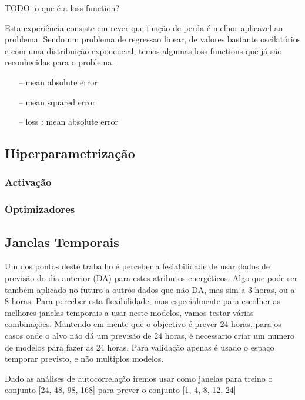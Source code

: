 TODO: o que é a loss function?

Esta experiência consiste em rever que função de perda é melhor aplicavel ao problema. Sendo um problema de regressao linear, de valores bastante oscilatórios e com uma distribuição exponencial, temos algumas loss functions que já são reconhecidas para o problema.

\begin{itemize}
    \item[--] mean absolute error
    \item[--] mean squared error    
    \item[--] loss : mean absolute error

\end{itemize}



\subsection{Hiperparametrização}

\subsubsection{Activação}

\subsubsection{Optimizadores}

\subsection{Janelas Temporais}

Um dos pontos deste trabalho é perceber a fesiabilidade de usar dados de previsão do dia anterior (DA) para estes atributos energéticos.
Algo que pode ser também aplicado no futuro a outros dados que não DA, mas sim a 3 horas, ou a 8 horas.
Para perceber esta flexibilidade, mas especialmente para escolher as melhores janelas temporais a usar neste modelos, vamos testar várias combinações.
Mantendo em mente que o objectivo é prever 24 horas, para os casos onde o alvo não dá um previsão de 24 horas, é necessario criar um numero de modelos para fazer as 24 horas.
Para validação apenas é usado o espaço temporar previsto, e não multiplos modelos.

Dado as análises de autocorrelação iremos usar como janelas para treino o conjunto [24, 48, 98, 168] para prever o conjunto [1, 4, 8, 12, 24]


